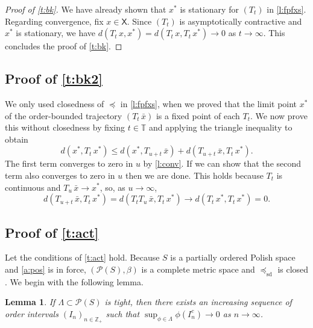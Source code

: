 \documentclass[12pt,reqno]{amsart}
\numberwithin{equation}{section}
\newtheorem{lemma}{Lemma}[section]
\theoremstyle{definition}
\newcommand{\1}{\mathbbm{1}}
\newcommand{\Z}{\mathbb{Z}}
\newcommand{\TT}{\mathbb T}
\newcommand{\pP}{\mathscr{P}}
\newcommand{\Xsf}{\mathsf{X}}
\newcommand{\precsd}{\preceq_{\textrm{sd}}}
\begin{document}
\begin{proof}[Proof of \cref{t:bk}]
    We have already shown that $x^*$ is stationary for $(T_t)$ in
    \cref{l:fpfxs}.  Regarding convergence, fix $x \in \Xsf$.  Since $(T_t)$
    is asymptotically contractive and $x^*$ is stationary, we have
    $d(T_t \, x, x^*) = d(T_t \, x, T_t \, x^*) \to 0$ as $t \to \infty$.
    This concludes the proof of \cref{t:bk}.
\end{proof}


\subsection{Proof of \texorpdfstring{\cref{t:bk2}}{Theorem \ref{t:bk2}}}

We only used closedness of $\preceq$ in \cref{l:fpfxs}, when we
proved that the limit point $x^*$ of the order-bounded trajectory $(T_t \,
\bar x)$ is a fixed point of each $T_t$.  We now prove this without
closedness by fixing $t \in \TT$ and applying the triangle inequality to
obtain
%
\begin{equation*}
    d(x^*, T_t \, x^*) \leq d(x^*, T_{u+t} \, \bar x) + d(T_{u+t} \, \bar x, T_t
    \, x^*).
\end{equation*}
%
The first term converges to zero in $u$ by \cref{l:conv}.  If we can
show that the second term also converges to zero in $u$ then we are done.
This holds because $T_t$ is continuous and $T_u \, \bar x \to x^*$, so, as $u
\to \infty$,
%
\begin{equation*}
    d(T_{u+t} \, \bar x, T_t \, x^*)
    = d(T_t T_u \, \bar x, T_t \, x^*)
    \to
    d(T_t \, x^*, T_t \, x^*) = 0.
\end{equation*}
%


\subsection{Proof of \texorpdfstring{\cref{t:act}}{Theorem \ref{t:act}}}

Let the conditions of \cref{t:act} hold. Because $S$ is a
partially ordered Polish space and \cref{a:pos} is in force, $(\pP(S), \beta)$
is a complete metric space \citep[Theorem~4.1]{kamihigashi2019unified}
and $\precsd$ is closed \citep{kamae1978stochastic}.
We begin with the following lemma.

\begin{lemma}\label{l:tt}
    If $\Lambda \subset \pP(S)$ is tight, then there exists an increasing sequence of order
    intervals $(I_n)_{n \in \Z_+}$ such that
    $\sup_{\phi \in \Lambda} \phi(I_n^c) \to 0$ as $n \to \infty$.
\end{lemma}
\end{document}
